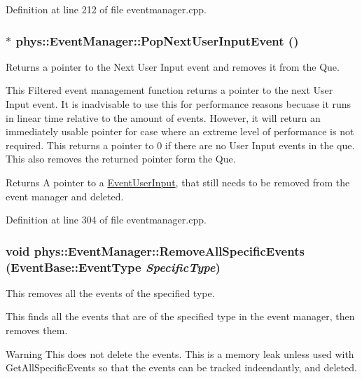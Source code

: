 Definition at line 212 of file eventmanager.cpp.

\hypertarget{classphys_1_1EventManager_afa89317d4b16c2b7065b9f79a4354654}{
\subsubsection[{PopNextUserInputEvent}]{ $\ast$ phys::EventManager::PopNextUserInputEvent ()}}
\label{da/dde/classphys_1_1EventManager_afa89317d4b16c2b7065b9f79a4354654}


Returns a pointer to the Next User Input event and removes it from the Que. 

This Filtered event management function returns a pointer to the next User Input event. It is inadvisable to use this for performance reasons becuase it runs in linear time relative to the amount of events. However, it will return an immediately usable pointer for case where an extreme level of performance is not required. This returns a pointer to 0 if there are no User Input events in the que. This also removes the returned pointer form the Que. \begin{DoxyReturn}{Returns}
A pointer to a \hyperlink{classphys_1_1EventUserInput}{EventUserInput}, that still needs to be removed from the event manager and deleted. 
\end{DoxyReturn}


Definition at line 304 of file eventmanager.cpp.

\hypertarget{classphys_1_1EventManager_ac38a5a7d003a3f92e40c842916094bde}{
\subsubsection[{RemoveAllSpecificEvents}]{\setlength{\rightskip}{0pt plus 5cm}void phys::EventManager::RemoveAllSpecificEvents ({\bf EventBase::EventType} {\em SpecificType})}}
\label{da/dde/classphys_1_1EventManager_ac38a5a7d003a3f92e40c842916094bde}


This removes all the events of the specified type. 

This finds all the events that are of the specified type in the event manager, then removes them. \begin{DoxyWarning}{Warning}
This does not delete the events. This is a memory leak unless used with GetAllSpecificEvents so that the events can be tracked indeendantly, and deleted. 
\end{DoxyWarning}



